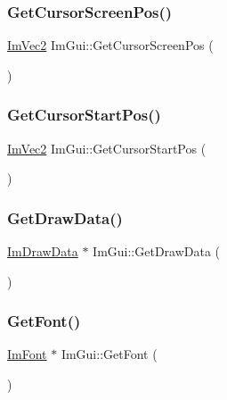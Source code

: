 \hypertarget{namespace_im_gui_adb0db3c1ee36f5085f35890a4229ae75}{}\label{namespace_im_gui_adb0db3c1ee36f5085f35890a4229ae75} 
\subsubsection{\texorpdfstring{Get\+Cursor\+Screen\+Pos()}{GetCursorScreenPos()}}
{\footnotesize\ttfamily \hyperlink{struct_im_vec2}{Im\+Vec2} Im\+Gui\+::\+Get\+Cursor\+Screen\+Pos (\begin{DoxyParamCaption}{ }\end{DoxyParamCaption})}

\hypertarget{namespace_im_gui_a8ee9647de3b39fc7b77395082fc9e0cc}{}\label{namespace_im_gui_a8ee9647de3b39fc7b77395082fc9e0cc} 
\subsubsection{\texorpdfstring{Get\+Cursor\+Start\+Pos()}{GetCursorStartPos()}}
{\footnotesize\ttfamily \hyperlink{struct_im_vec2}{Im\+Vec2} Im\+Gui\+::\+Get\+Cursor\+Start\+Pos (\begin{DoxyParamCaption}{ }\end{DoxyParamCaption})}

\hypertarget{namespace_im_gui_ab73131dc44b1267dac04f0c2bb0af983}{}\label{namespace_im_gui_ab73131dc44b1267dac04f0c2bb0af983} 
\subsubsection{\texorpdfstring{Get\+Draw\+Data()}{GetDrawData()}}
{\footnotesize\ttfamily \hyperlink{struct_im_draw_data}{Im\+Draw\+Data} $\ast$ Im\+Gui\+::\+Get\+Draw\+Data (\begin{DoxyParamCaption}{ }\end{DoxyParamCaption})}

\hypertarget{namespace_im_gui_a43cf349576e20fac4a1300269320ad8f}{}\label{namespace_im_gui_a43cf349576e20fac4a1300269320ad8f} 
\subsubsection{\texorpdfstring{Get\+Font()}{GetFont()}}
{\footnotesize\ttfamily \hyperlink{struct_im_font}{Im\+Font} $\ast$ Im\+Gui\+::\+Get\+Font (\begin{DoxyParamCaption}{ }\end{DoxyParamCaption})}

